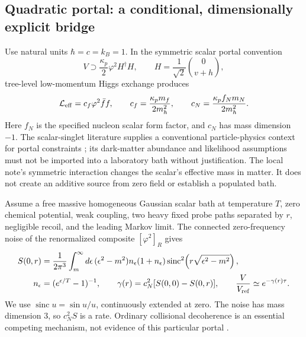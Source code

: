 \subsection{Quadratic portal: a conditional, dimensionally explicit bridge}
Use natural units $\hbar=c=k_B=1$. In the symmetric scalar portal convention
\begin{equation}
 V\supset\frac{\kappa_p}{2}\varphi^2H^\dagger H,
 \qquad H=\frac{1}{\sqrt2}\binom{0}{v+h},
\end{equation}
tree-level low-momentum Higgs exchange produces
\begin{equation}
 \mathcal L_{\rm eff}=c_f\varphi^2\bar f f,
 \qquad c_f=\frac{\kappa_pm_f}{2m_h^2},
 \qquad c_N=\frac{\kappa_pf_Nm_N}{2m_h^2}.
 \label{eq:portal}
\end{equation}
Here $f_N$ is the specified nucleon scalar form factor, and $c_N$ has mass dimension $-1$. The scalar-singlet literature supplies a conventional particle-physics context for portal constraints \cite{athron}; its dark-matter abundance and likelihood assumptions must not be imported into a laboratory bath without justification. The local note's symmetric interaction changes the scalar's effective mass in matter. It does not create an additive source from zero field or establish a populated bath.

Assume a free massive homogeneous Gaussian scalar bath at temperature $T$, zero chemical potential, weak coupling, two heavy fixed probe paths separated by $r$, negligible recoil, and the leading Markov limit. The connected zero-frequency noise of the renormalized composite $[\varphi^2]_R$ gives \cite{portal}
\begin{align}
 S(0,r)&=\frac{1}{2\pi^3}\int_m^\infty d\epsilon\,
 (\epsilon^2-m^2)n_\epsilon(1+n_\epsilon)
 \operatorname{sinc}^2\!\left(r\sqrt{\epsilon^2-m^2}\right),\\
 n_\epsilon&=(e^{\epsilon/T}-1)^{-1},\qquad
 \gamma(r)=c_N^2[S(0,0)-S(0,r)],\qquad
 \frac{V}{V_{\rm ref}}\simeq e^{-\gamma(r)\tau}.
 \label{eq:noise}
\end{align}
We use $\operatorname{sinc}u=\sin u/u$, continuously extended at zero. The noise has mass dimension $3$, so $c_N^2S$ is a rate. Ordinary collisional decoherence is an essential competing mechanism, not evidence of this particular portal \cite{hornberger}.


